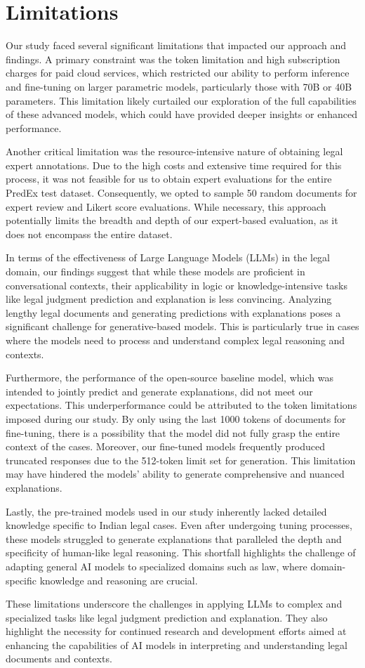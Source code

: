\section*{Limitations}
Our study faced several significant limitations that impacted our approach and findings. A primary constraint was the token limitation and high subscription charges for paid cloud services, which restricted our ability to perform inference and fine-tuning on larger parametric models, particularly those with 70B or 40B parameters. This limitation likely curtailed our exploration of the full capabilities of these advanced models, which could have provided deeper insights or enhanced performance.

Another critical limitation was the resource-intensive nature of obtaining legal expert annotations. Due to the high costs and extensive time required for this process, it was not feasible for us to obtain expert evaluations for the entire PredEx test dataset. Consequently, we opted to sample 50 random documents for expert review and Likert score evaluations. While necessary, this approach potentially limits the breadth and depth of our expert-based evaluation, as it does not encompass the entire dataset.

In terms of the effectiveness of Large Language Models (LLMs) in the legal domain, our findings suggest that while these models are proficient in conversational contexts, their applicability in logic or knowledge-intensive tasks like legal judgment prediction and explanation is less convincing. Analyzing lengthy legal documents and generating predictions with explanations poses a significant challenge for generative-based models. This is particularly true in cases where the models need to process and understand complex legal reasoning and contexts.

Furthermore, the performance of the open-source baseline model, which was intended to jointly predict and generate explanations, did not meet our expectations. This underperformance could be attributed to the token limitations imposed during our study. By only using the last 1000 tokens of documents for fine-tuning, there is a possibility that the model did not fully grasp the entire context of the cases. Moreover, our fine-tuned models frequently produced truncated responses due to the 512-token limit set for generation. This limitation may have hindered the models' ability to generate comprehensive and nuanced explanations.

Lastly, the pre-trained models used in our study inherently lacked detailed knowledge specific to Indian legal cases. Even after undergoing tuning processes, these models struggled to generate explanations that paralleled the depth and specificity of human-like legal reasoning. This shortfall highlights the challenge of adapting general AI models to specialized domains such as law, where domain-specific knowledge and reasoning are crucial.

These limitations underscore the challenges in applying LLMs to complex and specialized tasks like legal judgment prediction and explanation. They also highlight the necessity for continued research and development efforts aimed at enhancing the capabilities of AI models in interpreting and understanding legal documents and contexts.
